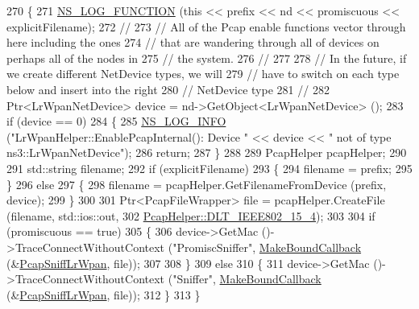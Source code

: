 \begin{DoxyCode}
270 \{
271   \hyperlink{log-macros-disabled_8h_a90b90d5bad1f39cb1b64923ea94c0761}{NS\_LOG\_FUNCTION} (\textcolor{keyword}{this} << prefix << nd << promiscuous << explicitFilename);
272   \textcolor{comment}{//}
273   \textcolor{comment}{// All of the Pcap enable functions vector through here including the ones}
274   \textcolor{comment}{// that are wandering through all of devices on perhaps all of the nodes in}
275   \textcolor{comment}{// the system.}
276   \textcolor{comment}{//}
277 
278   \textcolor{comment}{// In the future, if we create different NetDevice types, we will}
279   \textcolor{comment}{// have to switch on each type below and insert into the right}
280   \textcolor{comment}{// NetDevice type}
281   \textcolor{comment}{//}
282   Ptr<LrWpanNetDevice> device = nd->GetObject<LrWpanNetDevice> ();
283   \textcolor{keywordflow}{if} (device == 0)
284     \{
285       \hyperlink{group__logging_gafbd73ee2cf9f26b319f49086d8e860fb}{NS\_LOG\_INFO} (\textcolor{stringliteral}{"LrWpanHelper::EnablePcapInternal(): Device "} << device << \textcolor{stringliteral}{" not of type
       ns3::LrWpanNetDevice"});
286       \textcolor{keywordflow}{return};
287     \}
288 
289   PcapHelper pcapHelper;
290 
291   std::string filename;
292   \textcolor{keywordflow}{if} (explicitFilename)
293     \{
294       filename = prefix;
295     \}
296   \textcolor{keywordflow}{else}
297     \{
298       filename = pcapHelper.GetFilenameFromDevice (prefix, device);
299     \}
300 
301   Ptr<PcapFileWrapper> file = pcapHelper.CreateFile (filename, std::ios::out,
302                                                      
      \hyperlink{classns3_1_1PcapHelper_a2ee4dad28ddd9a1fe636f51835eaa77faed67ae3e9cc0ee85c7cb3a8acedb3b47}{PcapHelper::DLT\_IEEE802\_15\_4});
303 
304   \textcolor{keywordflow}{if} (promiscuous == \textcolor{keyword}{true})
305     \{
306       device->GetMac ()->TraceConnectWithoutContext (\textcolor{stringliteral}{"PromiscSniffer"}, 
      \hyperlink{group__makeboundcallback_ga1725d6362e6065faa0709f7c93f8d770}{MakeBoundCallback} (&\hyperlink{namespacens3_a8f59f912ed9764503e17291c29780cbf}{PcapSniffLrWpan}, file));
307 
308     \}
309   \textcolor{keywordflow}{else}
310     \{
311       device->GetMac ()->TraceConnectWithoutContext (\textcolor{stringliteral}{"Sniffer"}, 
      \hyperlink{group__makeboundcallback_ga1725d6362e6065faa0709f7c93f8d770}{MakeBoundCallback} (&\hyperlink{namespacens3_a8f59f912ed9764503e17291c29780cbf}{PcapSniffLrWpan}, file));
312     \}
313 \}
\end{DoxyCode}


